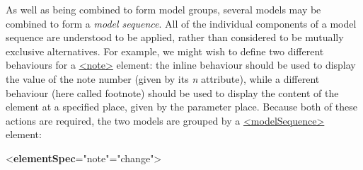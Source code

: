 As well as being combined to form model groups, several models may be combined to form a \textit{model sequence}. All of the individual components of a model sequence are understood to be applied, rather than considered to be mutually exclusive alternatives. For example, we might wish to define two different behaviours for a \hyperref[TEI.note]{<note>} element: the inline behaviour should be used to display the value of the note number (given by its {\itshape n} attribute), while a different behaviour (here called \textsf{footnote}) should be used to display the content of the element at a specified place, given by the parameter \textsf{place}. Because both of these actions are required, the two models are grouped by a \hyperref[TEI.modelSequence]{<modelSequence>} element: \par\bgroup{}\exampleFont \begin{shaded}\noindent\mbox{}{<\textbf{elementSpec}\hspace*{1em}{ident}="{note}"\hspace*{1em}{mode}="{change}">}\mbox{}\newline 
{}\mbox{}\newline 
\hspace*{1em}\mbox{}\newline 
\hspace*{1em}\hspace*{1em}\mbox{}\newline 

\end{shaded}
